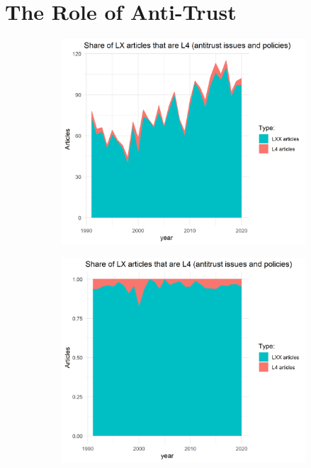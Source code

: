 \documentclass[11pt, letterpaper, twoside]{article}
\begin{document}
\newpage

\section{The Role of Anti-Trust}

\begin{figure}
    \begin{subfigure}[h]{0.49\textwidth}
        \centering
        \includegraphics[width=\textwidth]{L4-vs-LXX.png}
    \end{subfigure}
    \hfill
    \begin{subfigure}[h]{0.49\textwidth}
        \centering
        \includegraphics[width=\textwidth]{L4-vs-LXX-normalized.png}
    \end{subfigure}
\end{figure}
\end{document}
